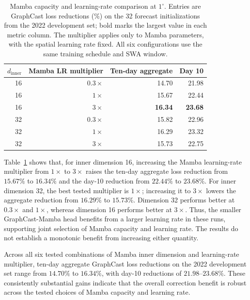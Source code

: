 \documentclass{article}
\newcommand{\vfourchange}[1]{{\color{blue}#1}}
\begin{document}
\begin{table}[!htbp]
    \centering
    \caption{Mamba capacity and learning-rate comparison at $1^\circ$. Entries are {GraphCast loss} reductions (\%) on the \vfourchange{32 forecast initializations from the 2022 development set}; bold marks the largest value in each metric column. The multiplier applies only to Mamba parameters, with the spatial learning rate fixed. All six configurations use the same training schedule and SWA window.}
    \label{tab:lr_sensitivity}
    \small
    \begin{tabular}{rrrr}
        \toprule
        $d_{\mathrm{inner}}$ & Mamba LR multiplier & Ten-day aggregate & Day 10 \\
        \midrule
        16 & $0.3\times$ & 14.70 & 21.98 \\
        16 & $1\times$   & 15.67 & 22.44 \\
        16 & $3\times$   & \textbf{16.34} & \textbf{23.68} \\
        32 & $0.3\times$ & 15.82 & 22.96 \\
        32 & $1\times$   & 16.29 & 23.32 \\
        32 & $3\times$   & 15.73 & 22.75 \\
        \bottomrule
    \end{tabular}
\end{table}

\begin{samepage}
Table~\ref{tab:lr_sensitivity} shows that, for inner dimension 16, increasing the Mamba learning-rate multiplier from $1\times$ to $3\times$ raises the ten-day aggregate loss reduction from $15.67\%$ to $16.34\%$ and the day-10 reduction from $22.44\%$ to $23.68\%$. For inner dimension 32, the best tested multiplier is $1\times$; increasing it to $3\times$ lowers the aggregate reduction from $16.29\%$ to $15.73\%$. Dimension 32 performs better at $0.3\times$ and $1\times$, whereas dimension 16 performs better at $3\times$. Thus, the smaller GraphCast-Mamba head benefits from a larger learning rate in these runs, supporting joint selection of Mamba capacity and learning rate. The results do not establish a monotonic benefit from increasing either quantity.\par
\end{samepage}

\vfourchange{Across all six tested combinations of Mamba inner dimension and learning-rate multiplier, ten-day aggregate GraphCast loss reductions on the 2022 development set range from $14.70\%$ to $16.34\%$, with day-10 reductions of $21.98$--$23.68\%$. These consistently substantial gains indicate that the overall correction benefit is robust across the tested choices of Mamba capacity and learning rate.}
\end{document}
